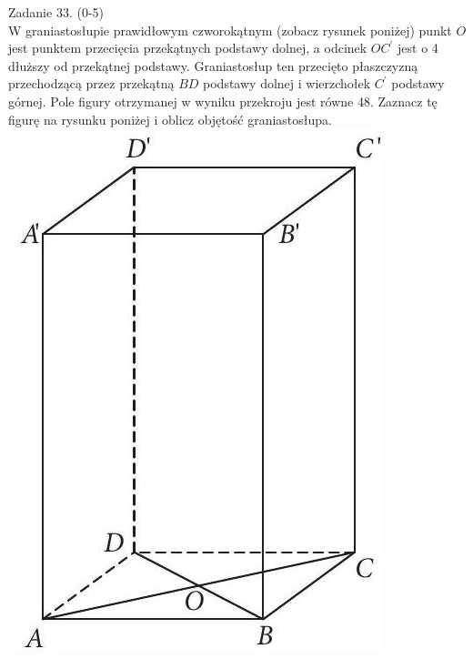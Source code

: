\documentclass[10pt]{article}
\begin{document}
Zadanie 33. (0-5)\\
W graniastosłupie prawidłowym czworokątnym (zobacz rysunek poniżej) punkt \(O\) jest punktem przecięcia przekątnych podstawy dolnej, a odcinek \(O C^{\prime}\) jest o 4 dłuższy od przekątnej podstawy. Graniastosłup ten przecięto płaszczyzną przechodzącą przez przekątną \(B D\) podstawy dolnej i wierzchołek \(C^{\prime}\) podstawy górnej. Pole figury otrzymanej w wyniku przekroju jest równe 48. Zaznacz tę figurę na rysunku poniżej i oblicz objętość graniastosłupa.\\
\includegraphics[max width=\textwidth, center]{2024_11_21_72158d4a4efa7dd894bcg-22}\\
\end{document}
